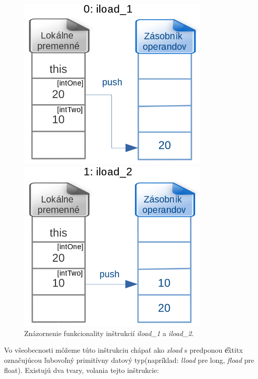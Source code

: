 \documentclass[11pt,final,oneside]{fithesis}
\begin{document}
\begin{figure}[H]
  \begin{minipage}{0.55\textwidth}
     \includegraphics[width=0.825\textwidth]{iload_1.png}
  \end{minipage}
  \begin{minipage}{0.55\textwidth}
     \includegraphics[width=0.825\textwidth]{iload_2.png}
  \end{minipage}
  \caption{Znázornenie funkcionality inštrukcií \textit{iload\_1} a
  \textit{iload\_2}.}
  \label{fig:gTiload}
\end{figure}

Vo všeobecnosti môžeme túto inštrukciu chápať ako \textit{xload} s predponou \t
extit{x} označujúcou ľubovoľný primitívny datový typ(napríklad: \textit{lload} 
pre long, \textit{fload} pre float). Existujú dva tvary, volania tejto 
inštrukcie: 
\end{document}
